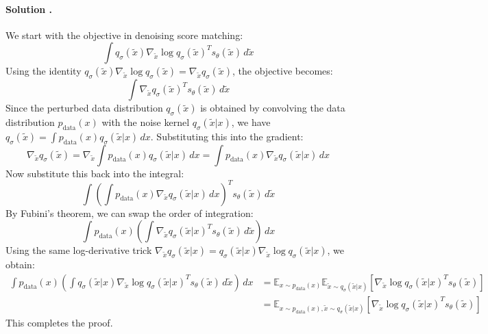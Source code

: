 \documentclass{article}
\newcounter{solutionCount}
\newcommand{\solution}[1]{
    \stepcounter{solutionCount}
    \paragraph{Solution \thesolutionCount.}
    {
        #1
    }
}
\begin{document}
\solution{
    We start with the objective in denoising score matching:
    \begin{equation*}
        \int q_\sigma(\tilde{x}) \nabla_{\tilde{x}} \log q_\sigma(\tilde{x})^T s_\theta(\tilde{x}) \, d\tilde{x}
    \end{equation*}
    Using the identity $q_\sigma(\tilde{x}) \nabla_{\tilde{x}} \log q_\sigma(\tilde{x}) = \nabla_{\tilde{x}} q_\sigma(\tilde{x})$, the objective becomes:
    \begin{equation*}
        \int \nabla_{\tilde{x}} q_\sigma(\tilde{x})^T s_\theta(\tilde{x}) \, d\tilde{x}
    \end{equation*}
    Since the perturbed data distribution $q_\sigma(\tilde{x})$ is obtained by convolving the data distribution $p_{\mathrm{data}}(x)$ with the noise kernel $q_\sigma(\tilde{x}|x)$, we have $q_\sigma(\tilde{x}) = \int p_{\mathrm{data}}(x) q_\sigma(\tilde{x}|x) \, dx$.
    Substituting this into the gradient:
    \begin{equation*}
        \nabla_{\tilde{x}} q_\sigma(\tilde{x}) = \nabla_{\tilde{x}} \int p_{\mathrm{data}}(x) q_\sigma(\tilde{x}|x) \, dx = \int p_{\mathrm{data}}(x) \nabla_{\tilde{x}} q_\sigma(\tilde{x}|x) \, dx
    \end{equation*}
    Now substitute this back into the integral:
    \begin{equation*}
        \int \left( \int p_{\mathrm{data}}(x) \nabla_{\tilde{x}} q_\sigma(\tilde{x}|x) \, dx \right)^T s_\theta(\tilde{x}) \, d\tilde{x}
    \end{equation*}
    By Fubini's theorem, we can swap the order of integration:
    \begin{equation*}
        \int p_{\mathrm{data}}(x) \left( \int \nabla_{\tilde{x}} q_\sigma(\tilde{x}|x)^T s_\theta(\tilde{x}) \, d\tilde{x} \right) \, dx
    \end{equation*}
    Using the same log-derivative trick $\nabla_{\tilde{x}} q_\sigma(\tilde{x}|x) = q_\sigma(\tilde{x}|x) \nabla_{\tilde{x}} \log q_\sigma(\tilde{x}|x)$, we obtain:
    \begin{align*}
        \int p_{\mathrm{data}}(x) \left( \int q_\sigma(\tilde{x}|x) \nabla_{\tilde{x}} \log q_\sigma(\tilde{x}|x)^T s_\theta(\tilde{x}) \, d\tilde{x} \right) \, dx &= \mathbb{E}_{x \sim p_{\mathrm{data}}(x)} \mathbb{E}_{\tilde{x} \sim q_\sigma(\tilde{x}|x)} \left[ \nabla_{\tilde{x}} \log q_\sigma(\tilde{x}|x)^T s_\theta(\tilde{x}) \right] \\
        &= \mathbb{E}_{x \sim p_{\mathrm{data}}(x), \tilde{x} \sim q_\sigma(\tilde{x}|x)} \left[ \nabla_{\tilde{x}} \log q_\sigma(\tilde{x}|x)^T s_\theta(\tilde{x}) \right]
    \end{align*}
    This completes the proof.
}
\end{document}
